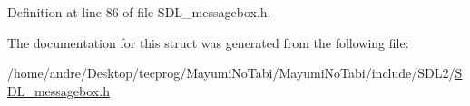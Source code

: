 Definition at line 86 of file S\-D\-L\-\_\-messagebox.\-h.



The documentation for this struct was generated from the following file\-:\begin{DoxyCompactItemize}
\item 
/home/andre/\-Desktop/tecprog/\-Mayumi\-No\-Tabi/\-Mayumi\-No\-Tabi/include/\-S\-D\-L2/\hyperlink{_s_d_l__messagebox_8h}{S\-D\-L\-\_\-messagebox.\-h}\end{DoxyCompactItemize}
